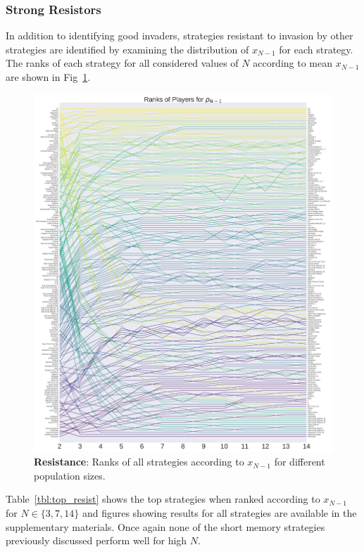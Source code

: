 \documentclass[10pt,letterpaper]{article}
\begin{document}
\subsubsection*{Strong Resistors}

In addition to identifying good invaders, strategies resistant to invasion by
other strategies are identified by examining the distribution of $x_{N-1}$ for
each strategy. The ranks of each strategy for all considered values of \(N\)
according to mean \(x_{N-1}\) are shown in Fig~\ref{fig:ranks_v_size_resist}.

\begin{figure}[!hbtp]
    \centering
    \includegraphics[width=\columnwidth]{./average_rank_vs_population_size_resist.pdf}
    \caption{\textbf{Resistance}: Ranks of all strategies according to \(x_{N-1}\) for different
    population sizes.}
    \label{fig:ranks_v_size_resist}
\end{figure}


Table~\ref{tbl:top_resist} shows the top strategies when ranked
according to \(x_{N-1}\) for \(N\in\{3, 7, 14\}\) and figures showing results
for all strategies are available in the supplementary materials.
Once again none of the short memory strategies previously discussed perform well for high \(N\).
\end{document}
